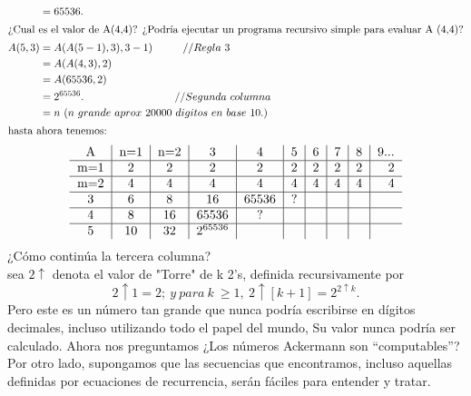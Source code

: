 \begin{align*}
&=65536.\\
\intertext{¿Cual es el valor de A(4,4)?  
¿Podría ejecutar un programa recursivo simple para evaluar A (4,4)?}
A(5,3) &= A(A(5-1),3),3-1) \hspace*{1cm} // Regla~3\\
&= A(A(4,3), 2) \hspace*{2cm} \\
&=A(65536,2)	\hspace*{2,3cm}\\
&=2^{65536}.\hspace*{3cm}// Segunda~columna\\
&=n~(n~ grande~aprox~20000~digitos~en~base~10.)\\
\intertext{hasta ahora tenemos:}
\end{align*}
\begin{equation*}
\begin{tabular}{c|c|c|c|c|c|c|c|c|r}
A & n=1 & n=2 & 3 & 4 & 5 & 6 & 7 & 8 & 9... \\
\hline
m=1 & 2 & 2 & 2 & 2 & 2 & 2 & 2 & 2 & 2 \\
\hline
m=2 & 4 & 4 & 4 & 4 & 4 & 4 & 4 & 4 & 4 \\
\hline
3   & 6 & 8 & 16 & 65536 & ? &  &  &  &  \\
\hline
4   & 8 & 16 & 65536 & ? &  &  &  &  &  \\
\hline
5  & 10 & 32 & $2^{65536}$ &  &  &  &  &  &  \\
\end{tabular}
\end{equation*}
¿Cómo continúa la tercera columna?\\
sea $2\uparrow$ denota el valor de "Torre" de k 2's, definida recursivamente por 
$$2\uparrow 1= 2;~ y~ para~ k ~\geq 1,~ 2\uparrow [k+1]= 2^{2\uparrow k}.$$
Pero este es un número tan grande que nunca podría escribirse en dígitos decimales, incluso utilizando todo el papel del mundo, Su valor nunca podría ser calculado. Ahora nos preguntamos ¿Los números Ackermann son “computables”? Por otro lado, supongamos que las secuencias que encontramos, incluso aquellas definidas por ecuaciones de recurrencia, serán fáciles para entender y tratar.